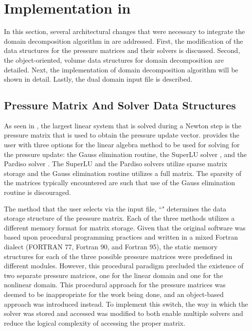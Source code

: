 \section{Implementation in \cobra{}}
\label{sec:dd_algo}

In this section, several architectural changes that were necessary to integrate the domain decomposition algorithm in  are addressed.
First, the modification of the data structures for the pressure matrices and their solvers is discussed.
Second, the object-oriented, volume data structures for domain decomposition are detailed.
Next, the implementation of domain decomposition algorithm will be shown in detail.
Lastly, the dual domain input file is described.

\subsection{Pressure Matrix And Solver Data Structures}
\label{subsect:domDecompSolverStructs}

As seen in , the largest linear system that is solved during a Newton step is the pressure matrix that is used to obtain the pressure update vector.
\cobra{} provides the user with three options for the linear algebra method to be used for solving for the pressure update: the Gauss elimination routine, the SuperLU solver \cite{Li1999}, and the Pardiso solver \cite{Schenk2006, Schenk2007}.
The SuperLU and the Pardiso solvers utilize sparse matrix storage and the Gauss elimination routine utilizes a full matrix.
The sparsity of the matrices typically encountered are such that use of the Gauss elimination routine is discouraged.

The method that the user selects via the \cobra{} input file, ``" determines the data storage structure of the pressure matrix.
Each of the three methods utilizes a different memory format for matrix storage.
Given that the original software was based upon procedural programming practices and written in a mixed Fortran dialect (FORTRAN 77, Fortran 90, and Fortran 95), the static memory structures for each of the three possible pressure matrices were predefined in different modules.
However, this procedural paradigm precluded the existence of two separate pressure matrices, one for the linear domain and one for the nonlinear domain.
This procedural approach for the pressure matrices was deemed to be inappropriate for the work being done, and an object-based approach was introduced instead.
To implement this switch, the way in which the solver was stored and accessed was modified to both enable multiple solvers and reduce the logical complexity of accessing the proper matrix.


